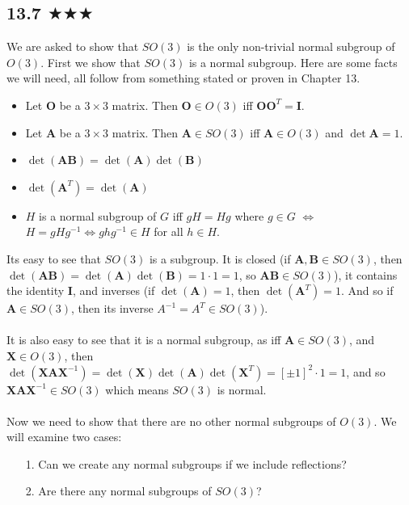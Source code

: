 \subsection{13.7 $\bigstar \bigstar\bigstar $}
We are asked to show that $SO(3)$ is the only non-trivial normal subgroup of $O(3)$. First we show that $SO(3)$ is a normal subgroup. Here are some facts we will need, all follow from something stated or proven in Chapter 13.
\begin{itemize}
\item Let $\mathbf{O}$ be a $3\times 3$ matrix. Then $\mathbf{O}\in O(3)$ iff $\mathbf{O}\mathbf{O}^T=\mathbf{I}$.
\item   Let $\mathbf{A}$ be a $3\times 3$ matrix. Then $\mathbf{A}\in SO(3)$ iff $\mathbf{A}\in O(3)$ and $\det\mathbf{A}=1$.
\item $\det( \mathbf{AB})=\det(\mathbf{A})\det(\mathbf{B})$
\item $\det(\mathbf{A}^T)=\det(\mathbf{A})$
\item $H$ is a normal subgroup of $G$ iff $g H=Hg$ where $g\in G$ $\iff$ $H=gH g^{-1}\iff gh g^{-1}\in H $ for all $h\in H$.
\end{itemize} 
Its easy to see that $SO(3)$ is a subgroup. It is closed (if $\mathbf{A},\mathbf{B}\in SO(3)$, then $\det(\mathbf{A}\mathbf{B})=\det(\mathbf{A})\det(\mathbf{B})=1\cdot 1=1$, so $\mathbf{A}\mathbf{B}\in SO(3)$), it contains the identity \textbf{I}, and inverses (if $\det(\mathbf{A})=1$, then $\det(\mathbf{A}^T)=1$. And so if $\mathbf{A}\in SO(3)$, then its inverse $A^{-1}=A^T\in SO(3)$). \\ \\ It is also easy to see that it is a normal subgroup, as iff $\mathbf{A}\in SO(3)$, and $\mathbf{X}\in O(3)$, then $\det(\mathbf{X}\mathbf{A}\mathbf{X}^{-1})=\det(\mathbf{X})\det(\mathbf{A})\det(\mathbf{X}^T)=[\pm 1]^2 \cdot 1=1$, and so $\mathbf{X}\mathbf{A}\mathbf{X}^{-1}\in SO(3)$ which means $SO(3)$ is normal.  \\ \\ Now we need to show that there are no other normal subgroups of $O(3)$. We will examine two cases:
\begin{itemize}
\item[1.] Can we create any normal subgroups if we include reflections?
\item[2.] Are there any normal subgroups of $SO(3)$?
\end{itemize}
